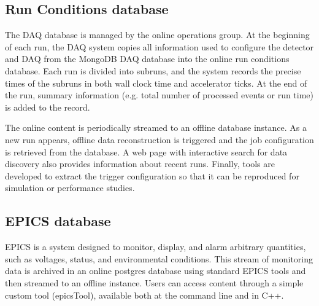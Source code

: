 


\subsection{Run Conditions database} 
The DAQ database is managed by the online operations group. At the beginning of each run, the DAQ system copies all information used to configure the detector and DAQ from the MongoDB DAQ database into the online run conditions database. Each run is divided into subruns, and the system records the precise times of the subruns in both wall clock time and accelerator ticks. At the end of the run, summary information (e.g. total number of processed events or run time) is added to the record. 

The online content is periodically streamed to an offline database instance. As a new run appears, offline data reconstruction is triggered and the job configuration is retrieved from the database. A web page with interactive search for data discovery also provides information about recent runs. Finally, tools are developed to extract the trigger configuration so that it can be reproduced for simulation or performance studies. 

\subsection{EPICS database}
EPICS is a system designed to monitor, display, and alarm arbitrary quantities, such as voltages, status, and environmental conditions. This stream of monitoring data is archived in an online postgres database using standard EPICS tools and then streamed to an offline instance. Users can access content through a simple custom tool (epicsTool), available both at the command line and in C++.

